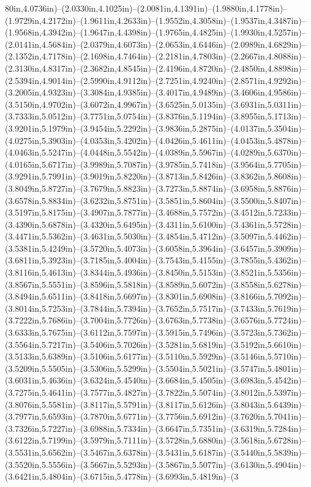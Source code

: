 80in,4.0736in)--(2.0330in,4.1025in)--(2.0081in,4.1391in)--(1.9880in,4.1778in)--(1.9729in,4.2172in)--(1.9611in,4.2633in)--(1.9552in,4.3058in)--(1.9537in,4.3487in)--(1.9568in,4.3942in)--(1.9647in,4.4398in)--(1.9765in,4.4825in)--(1.9930in,4.5257in)--(2.0141in,4.5684in)--(2.0379in,4.6073in)--(2.0653in,4.6446in)--(2.0989in,4.6829in)--(2.1352in,4.7178in)--(2.1698in,4.7464in)--(2.2181in,4.7803in)--(2.2667in,4.8088in)--(2.3130in,4.8317in)--(2.3682in,4.8545in)--(2.4196in,4.8720in)--(2.4850in,4.8898in)--(2.5394in,4.9014in)--(2.5990in,4.9112in)--(2.7251in,4.9240in)--(2.8571in,4.9292in)--(3.2005in,4.9323in)--(3.3084in,4.9385in)--(3.4017in,4.9489in)--(3.4606in,4.9586in)--(3.5150in,4.9702in)--(3.6072in,4.9967in)--(3.6525in,5.0135in)--(3.6931in,5.0311in)--(3.7333in,5.0512in)--(3.7751in,5.0754in)--(3.8376in,5.1194in)--(3.8955in,5.1713in)--(3.9201in,5.1979in)--(3.9454in,5.2292in)--(3.9836in,5.2875in)--(4.0137in,5.3504in)--(4.0275in,5.3903in)--(4.0353in,5.4202in)--(4.0426in,5.4611in)--(4.0453in,5.4878in)--(4.0463in,5.5247in)--(4.0448in,5.5542in)--(4.0389in,5.5967in)--(4.0289in,5.6370in)--(4.0165in,5.6717in)--(3.9989in,5.7087in)--(3.9785in,5.7418in)--(3.9564in,5.7705in)--(3.9291in,5.7991in)--(3.9019in,5.8220in)--(3.8713in,5.8426in)--(3.8362in,5.8608in)--(3.8049in,5.8727in)--(3.7679in,5.8823in)--(3.7273in,5.8874in)--(3.6958in,5.8876in)--(3.6578in,5.8834in)--(3.6232in,5.8751in)--(3.5851in,5.8604in)--(3.5500in,5.8407in)--(3.5197in,5.8175in)--(3.4907in,5.7877in)--(3.4688in,5.7572in)--(3.4512in,5.7233in)--(3.4390in,5.6878in)--(3.4320in,5.6495in)--(3.4311in,5.6100in)--(3.4361in,5.5728in)--(3.4471in,5.5362in)--(3.4631in,5.5030in)--(3.4854in,5.4712in)--(3.5097in,5.4462in)--(3.5381in,5.4249in)--(3.5720in,5.4073in)--(3.6058in,5.3964in)--(3.6457in,5.3909in)--(3.6811in,5.3923in)--(3.7185in,5.4004in)--(3.7543in,5.4155in)--(3.7855in,5.4362in)--(3.8116in,5.4613in)--(3.8344in,5.4936in)--(3.8450in,5.5153in)--(3.8521in,5.5356in)--(3.8567in,5.5551in)--(3.8596in,5.5818in)--(3.8589in,5.6072in)--(3.8558in,5.6278in)--(3.8494in,5.6511in)--(3.8418in,5.6697in)--(3.8301in,5.6908in)--(3.8166in,5.7092in)--(3.8014in,5.7253in)--(3.7844in,5.7394in)--(3.7652in,5.7517in)--(3.7433in,5.7619in)--(3.7222in,5.7686in)--(3.7004in,5.7726in)--(3.6763in,5.7738in)--(3.6576in,5.7724in)--(3.6333in,5.7675in)--(3.6112in,5.7597in)--(3.5915in,5.7496in)--(3.5723in,5.7362in)--(3.5564in,5.7217in)--(3.5406in,5.7026in)--(3.5281in,5.6819in)--(3.5192in,5.6610in)--(3.5133in,5.6389in)--(3.5106in,5.6177in)--(3.5110in,5.5929in)--(3.5146in,5.5710in)--(3.5209in,5.5505in)--(3.5306in,5.5299in)--(3.5504in,5.5021in)--(3.5747in,5.4801in)--(3.6031in,5.4636in)--(3.6324in,5.4540in)--(3.6684in,5.4505in)--(3.6983in,5.4542in)--(3.7275in,5.4641in)--(3.7577in,5.4827in)--(3.7822in,5.5074in)--(3.8012in,5.5397in)--(3.8076in,5.5581in)--(3.8117in,5.5791in)--(3.8117in,5.6126in)--(3.8043in,5.6439in)--(3.7977in,5.6593in)--(3.7870in,5.6771in)--(3.7756in,5.6912in)--(3.7620in,5.7041in)--(3.7326in,5.7227in)--(3.6988in,5.7334in)--(3.6647in,5.7351in)--(3.6319in,5.7284in)--(3.6122in,5.7199in)--(3.5979in,5.7111in)--(3.5728in,5.6880in)--(3.5618in,5.6728in)--(3.5531in,5.6562in)--(3.5467in,5.6378in)--(3.5431in,5.6187in)--(3.5440in,5.5839in)--(3.5520in,5.5556in)--(3.5667in,5.5293in)--(3.5867in,5.5077in)--(3.6130in,5.4904in)--(3.6421in,5.4804in)--(3.6715in,5.4778in)--(3.6993in,5.4819in)--(3